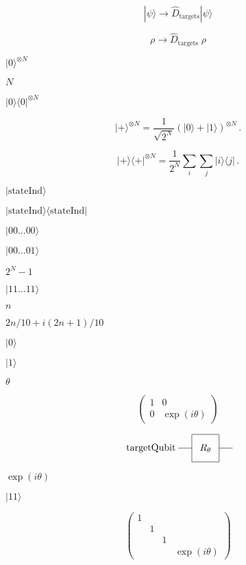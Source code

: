 \documentclass{article}
\begin{document}
\[
     |\psi\rangle \rightarrow \hat{D}_{\text{targets}} |\psi\rangle
\]
\pagebreak

\[
     \rho \rightarrow \hat{D}_{\text{targets}} \; \rho
\]
\pagebreak

$ {| 0 \rangle}^{\otimes N} $
\pagebreak

$ N $
\pagebreak

$ {| 0 \rangle\langle 0 |}^{\otimes N} $
\pagebreak

\[ 
  {| + \rangle}^{\otimes N} = \frac{1}{\sqrt{2^N}} (| 0 \rangle + | 1 \rangle)^{\otimes N}\,.
\]
\pagebreak

\[ 
  {| + \rangle\langle+|}^{\otimes N} = \frac{1}{{2^N}} \sum_i\sum_j |i\rangle\langle j|\,.
\]
\pagebreak

$ | \text{stateInd} \rangle $
\pagebreak

$ | \text{stateInd} \rangle \langle \text{stateInd} | $
\pagebreak

$ | 00 \dots 00 \rangle $
\pagebreak

$ | 00 \dots 01 \rangle $
\pagebreak

$ 2^N - 1 $
\pagebreak

$ | 11 \dots 11 \rangle $
\pagebreak

$n$
\pagebreak

$2n/10 + i(2n+1)/10$
\pagebreak

$ |0\rangle $
\pagebreak

$ |1\rangle $
\pagebreak

$\theta$
\pagebreak

\[
\begin{pmatrix}
1 & 0 \\
0 & \exp(i \theta)
\end{pmatrix}
\]
\pagebreak

\[
             \begin{tikzpicture}[scale=.5]
             \node[draw=none] at (-4, 0) {targetQubit};

             \draw (-2,0) -- (-1, 0);
             \draw (1, 0) -- (2, 0);
             \draw (-1,-1)--(-1,1)--(1,1)--(1,-1)--cycle;
             \node[draw=none] at (0, 0) {$R_\theta$};
             \end{tikzpicture}
 \]
\pagebreak

$ \exp(i \theta) $
\pagebreak

$ |11\rangle $
\pagebreak

\[
\begin{pmatrix}
1 & & & \\
& 1 & & \\
& & 1 & \\
& & & \exp(i \theta)
\end{pmatrix}
\]
\pagebreak
\end{document}
